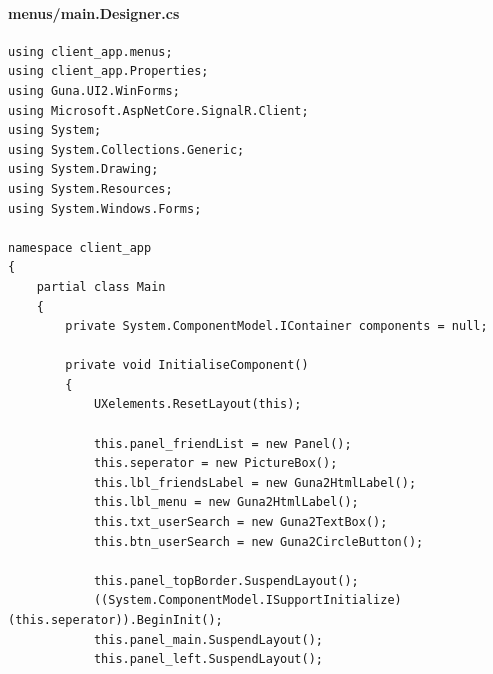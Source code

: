 \documentclass{article}
\begin{document}
\paragraph{menus/main.Designer.cs}\label{client/menus/main.designer.cs}
\begin{verbatim}
using client_app.menus;
using client_app.Properties;
using Guna.UI2.WinForms;
using Microsoft.AspNetCore.SignalR.Client;
using System;
using System.Collections.Generic;
using System.Drawing;
using System.Resources;
using System.Windows.Forms;

namespace client_app
{
	partial class Main
	{
		private System.ComponentModel.IContainer components = null;

		private void InitialiseComponent()
		{
			UXelements.ResetLayout(this);

			this.panel_friendList = new Panel();
			this.seperator = new PictureBox();
			this.lbl_friendsLabel = new Guna2HtmlLabel();
			this.lbl_menu = new Guna2HtmlLabel();
			this.txt_userSearch = new Guna2TextBox();
			this.btn_userSearch = new Guna2CircleButton();

			this.panel_topBorder.SuspendLayout();
			((System.ComponentModel.ISupportInitialize)(this.seperator)).BeginInit();
			this.panel_main.SuspendLayout();
			this.panel_left.SuspendLayout();


\end{verbatim}
\end{document}
